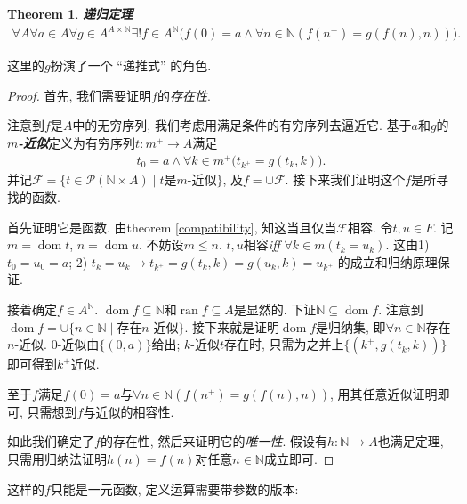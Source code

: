 \documentclass[openany]{ctexbook}
\newcommand*{\indexbf}[1]{\emph{\textbf{#1}}\index{#1}} %
\theoremstyle{plain}
\newtheorem{theorem}{Theorem}[section] %
\theoremstyle{definition}
\DeclareMathOperator{\dom}{dom}
\DeclareMathOperator{\ran}{ran}
\begin{document}
\begin{theorem} \indexbf{递归定理}
\begin{align*}
	\forall A\forall a\in A\forall g \in A^{A\times \mathbb N}\exists ! f\in A^\mathbb N\big(
		f(0)=a \wedge \forall n\in \mathbb N(
			f(n^+) = g(f(n),n))\big).
\end{align*}
\end{theorem}
这里的$g$扮演了一个 ``递推式'' 的角色.
\begin{proof}
首先, 我们需要证明$f$的\emph{存在性}. 

注意到$f$是$A$中的无穷序列, 我们考虑用满足条件的有穷序列去逼近它.
基于$a$和$g$的\indexbf{$m$-近似}定义为有穷序列$t\colon m^+\to A$满足
\begin{align*}
	t_0 = a\wedge \forall k\in m^+\big(
		t_{k^+} = g(t_k,k)\big).
\end{align*}
并记$
\mathcal F = \{ t\in \mathscr P(\mathbb N\times A)\mid t\text{是$m$-近似}\}$, 及$
f = \cup \mathcal F$. 接下来我们证明这个$f$是所寻找的函数.

首先证明它是函数. 
由theorem \ref{compatibility}, 知这当且仅当$\mathcal F$相容. 
令$t,u\in F$. 记$m=\dom t$, $n=\dom u$. 不妨设$m\leq n$.
$t,u$相容\emph{iff} $\forall k\in m (t_k = u_k)$. 
这由1) $t_0=u_0=a$; 2) $t_k =u_k \to t_{k^+} = g( t_k,k) = g(u_k,k) = u_{k^+}$ 的成立和归纳原理保证.

接着确定$f \in A^\mathbb N$. $\dom f \subseteq \mathbb N $和$\ran f \subseteq A$是显然的.
下证$\mathbb N \subseteq \dom f$. 注意到$\dom f = \cup \{ n\in \mathbb N\mid \text{存在$n$-近似}\}$.
接下来就是证明$\dom f$是归纳集, 即$\forall n\in \mathbb N$存在$n$-近似. 
$0$-近似由$\{(0,a)\}$给出; $k$-近似$t$存在时, 只需为之并上$\{(k^+, g(t_k, k))\}$即可得到$k^+$近似.

至于$f$满足$f(0)=a$与$\forall n\in \mathbb N(f(n^+) = g(f(n),n))$, 用其任意近似证明即可, 只需想到$f$与近似的相容性.

如此我们确定了$f$的存在性, 然后来证明它的\emph{唯一性}. 
假设有$h: \mathbb N \to A$也满足定理, 只需用归纳法证明$h(n)=f(n)$对任意$n\in \mathbb N$成立即可. 
\end{proof}

这样的$f$只能是一元函数, 定义运算需要带参数的版本:
\end{document}
